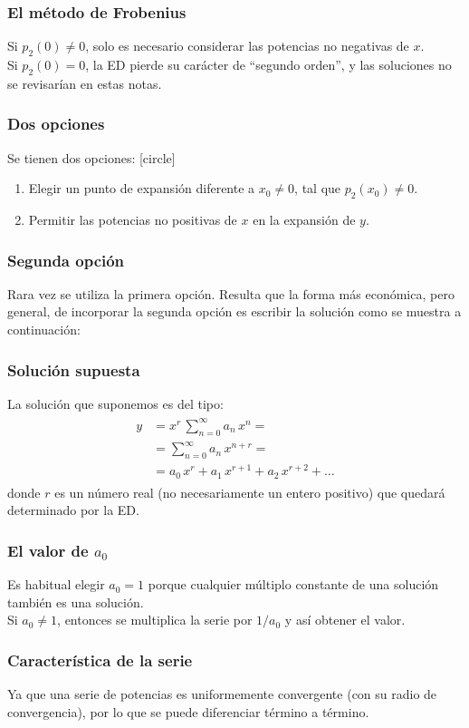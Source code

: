 \begin{frame}
\frametitle{El método de Frobenius}
Si $p_{2} (0) \neq 0$, solo es necesario considerar las potencias no negativas de $x$.
\\
\bigskip
\pause
Si $p_{2} (0) = 0$, la ED pierde su carácter de \enquote{segundo orden}, y las soluciones no se revisarían en estas notas.
\end{frame}
\begin{frame}
\frametitle{Dos opciones}
Se tienen dos opciones:
[circle]
\begin{enumerate}[<+->]
\item Elegir un punto de expansión diferente a $x_{0} \neq 0$, tal que $p_{2} (x_{0}) \neq 0$.
\item Permitir las potencias no positivas de $x$ en la expansión de $y$.
\end{enumerate}
\end{frame}
\begin{frame}
\frametitle{Segunda opción}
Rara vez se utiliza la primera opción. Resulta que la forma más económica, pero general, de incorporar la segunda opción es escribir la solución como se muestra a continuación:
\end{frame}
\begin{frame}
\frametitle{Solución supuesta}
La solución que suponemos es del tipo:
\begin{align}
\begin{aligned}
y &= x^{r} \, \sum_{n=0}^{\infty} a_{n} \, x^{n} = \\[0.5em]
&= \sum_{n=0}^{\infty} a_{n} \, x^{n+r} = \\[0.5em]
&= a_{0} \, x^{r} + a_{1} \, x^{r+1} + a_{2} \, x^{r+2} + \ldots
\end{aligned}
\label{eq:ecuacion_26_08}    
\end{align}
donde $r$ es un número real (no necesariamente un entero positivo) que quedará determinado por la ED.
\end{frame}
\begin{frame}
\frametitle{El valor de $a_{0}$}
Es habitual elegir $a_{0} = 1$ porque cualquier múltiplo constante de una solución también es una solución.
\\
\bigskip
Si $a_{0} \neq 1$, entonces se multiplica la serie por $1/a_{0}$ y así obtener el valor.
\end{frame}
\begin{frame}
\frametitle{Característica de la serie}
Ya que una serie de potencias es uniformemente convergente (con su radio de convergencia), por lo que se puede diferenciar término a término.
\end{frame}
